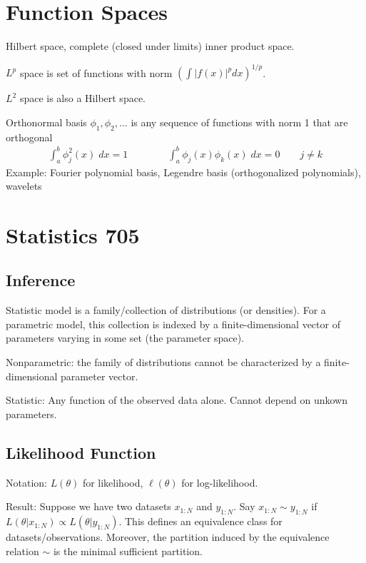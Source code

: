 \documentclass[12pt]{article}
\theoremstyle{plain}
\theoremstyle{definition}
\theoremstyle{remark}
\begin{document}
\clearpage
\section{Function Spaces}

Hilbert space, complete (closed under limits) inner product space.

$L^p$ space is set of functions with norm
$\left(\int |f(x)|^p dx\right)^{1/p}$.

$L^2$ space is also a Hilbert space.

Orthonormal basis $\phi_1,\phi_2,\ldots$ is any sequence of functions
with norm 1 that are orthogonal
\begin{align*}
  \int^b_a \phi_j^2(x)\;dx=1
  \qquad
  \qquad
  \int^b_a \phi_j(x)\phi_k(x)\;dx=0
  \qquad
  j\neq k
\end{align*}
Example: Fourier polynomial basis, Legendre basis (orthogonalized
polynomials), wavelets




\clearpage
\section{Statistics 705}






\subsection{Inference}

Statistic model is a family/collection of distributions (or densities).
For a parametric model, this collection is indexed by a
finite-dimensional vector of parameters varying in some set (the
parameter space).

Nonparametric: the family of distributions cannot be characterized by a
finite-dimensional parameter vector.

Statistic: Any function of the observed data alone.
Cannot depend on unkown parameters.




\subsection{Likelihood Function}

Notation: $L(\theta)$ for likelihood, $\ell(\theta)$ for log-likelihood.

Result:
Suppose we have two datasets $x_{1:N}$ and $y_{1:N}$.
Say $x_{1:N}\sim y_{1:N}$ if
$L(\theta|x_{1:N})\propto L(\theta|y_{1:N})$.
This defines an equivalence class for datasets/observations.
Moreover, the partition induced by the equivalence relation $\sim$ is
the minimal sufficient partition.
\end{document}

